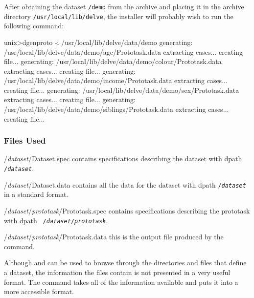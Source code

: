 After obtaining the dataset \texttt{/demo} from the \delve{} archive
and placing it in the archive \delve{} directory
\texttt{/usr/local/lib/delve}, the installer will probably wish to run
the following command:

\begin{Session} 
unix>dgenproto -i /usr/local/lib/delve/data/demo generating:
/usr/local/lib/delve/data/demo/age/Prototask.data
  extracting cases...
  creating file...
generating: /usr/local/lib/delve/data/demo/colour/Prototask.data
  extracting cases...
  creating file...
generating: /usr/local/lib/delve/data/demo/income/Prototask.data
  extracting cases...
  creating file...
generating: /usr/local/lib/delve/data/demo/sex/Prototask.data
  extracting cases...
  creating file...
generating: /usr/local/lib/delve/data/demo/siblings/Prototask.data
  extracting cases...
  creating file...
\end{Session}

\subsubsection*{Files Used}
\begin{ttdescription}
\item[/{\rm\em dataset\/}/Dataset.spec]
    contains specifications describing the dataset with dpath
    \texttt{/{\rm\em dataset}}.
\item[/{\rm\em dataset\/}/Dataset.data]
    contains all the data for the dataset with dpath
    \texttt{/{\rm\em dataset}} in a \delve{} standard format.  
\item[/{\rm\em dataset\/}/{\rm\em prototask\/}/Prototask.spec]
    contains specifications describing the prototask with dpath {\tt
    /{\rm\em dataset\/}/{\rm\em prototask}}.
\item[/{\rm\em dataset\/}/{\rm\em prototask\/}/Prototask.data]
    this is the output file produced by the command.
\end{ttdescription}

\newpage

%
%


Although \dls{} and \dmore{} can be used to browse through the
directories and files that define a dataset, the information the files
contain is not presented in a very useful format.  The \dinfo{}
command takes all of the information available and puts it into a more
accessible format.

